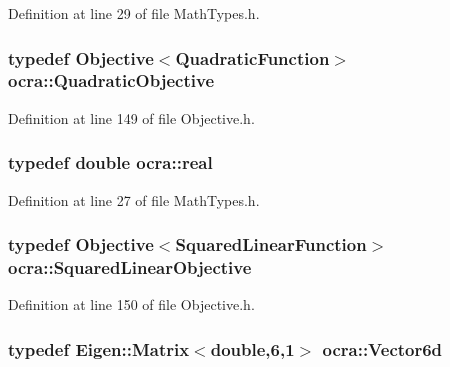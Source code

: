 Definition at line 29 of file Math\+Types.\+h.

\subsubsection[{\texorpdfstring{Quadratic\+Objective}{QuadraticObjective}}]{\setlength{\rightskip}{0pt plus 5cm}typedef {\bf Objective}$<${\bf Quadratic\+Function}$>$ {\bf ocra\+::\+Quadratic\+Objective}}\hypertarget{namespaceocra_a0b50673710f087c0f1733aefd1a8e0f7}{}\label{namespaceocra_a0b50673710f087c0f1733aefd1a8e0f7}


Definition at line 149 of file Objective.\+h.

\subsubsection[{\texorpdfstring{real}{real}}]{\setlength{\rightskip}{0pt plus 5cm}typedef double {\bf ocra\+::real}}\hypertarget{namespaceocra_af4478308ca113669e67d72f9a3050469}{}\label{namespaceocra_af4478308ca113669e67d72f9a3050469}


Definition at line 27 of file Math\+Types.\+h.

\subsubsection[{\texorpdfstring{Squared\+Linear\+Objective}{SquaredLinearObjective}}]{\setlength{\rightskip}{0pt plus 5cm}typedef {\bf Objective}$<${\bf Squared\+Linear\+Function}$>$ {\bf ocra\+::\+Squared\+Linear\+Objective}}\hypertarget{namespaceocra_aa6eaed809f9ce42cd96ecd92ddc61f0a}{}\label{namespaceocra_aa6eaed809f9ce42cd96ecd92ddc61f0a}


Definition at line 150 of file Objective.\+h.

\subsubsection[{\texorpdfstring{Vector6d}{Vector6d}}]{\setlength{\rightskip}{0pt plus 5cm}typedef Eigen\+::\+Matrix$<$double,6,1$>$ {\bf ocra\+::\+Vector6d}}\hypertarget{namespaceocra_a72fe7d6cf8411efbfc475a3a78209867}{}\label{namespaceocra_a72fe7d6cf8411efbfc475a3a78209867}


